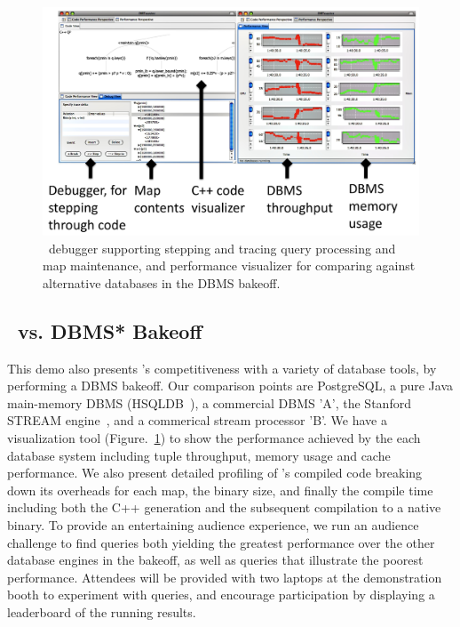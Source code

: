 \begin{figure}[tb]
\begin{center}
\includegraphics[scale=0.088]{figures/dbt-gui2}
\end{center}

\vspace{-4mm}

\caption{\compiler\ debugger supporting stepping and tracing query processing and
map maintenance, and performance visualizer for comparing against alternative
databases in the DBMS bakeoff.}
\label{fig:debugperfgui}

\vspace{-2mm}
\end{figure}

\vspace{10mm}

\subsection{\compiler\ vs. DBMS* Bakeoff}
This demo also presents \compiler's competitiveness with a variety of database
tools, by performing a DBMS bakeoff. Our comparison points are PostgreSQL, a pure
Java main-memory DBMS (HSQLDB~\cite{hsqldb-url}), a commercial DBMS 'A', the
Stanford STREAM engine~\cite{motwani-cidr:03}, and a commerical stream processor
'B'. We have a visualization tool (Figure.~\ref{fig:debugperfgui}) to show the
performance achieved by the each database system including tuple throughput,
memory usage and cache performance. We also present detailed profiling of
\compiler's compiled code breaking down its overheads for each map, the binary
size, and finally the compile time including both the C++ generation and the
subsequent compilation to a native binary. To provide an entertaining audience
experience, we run an audience challenge to find queries both yielding the
greatest performance over the other database engines in the bakeoff, as well as
queries that illustrate the poorest performance. Attendees will be provided with
two laptops at the demonstration booth to experiment with queries, and encourage
participation by displaying a leaderboard of the running results.

